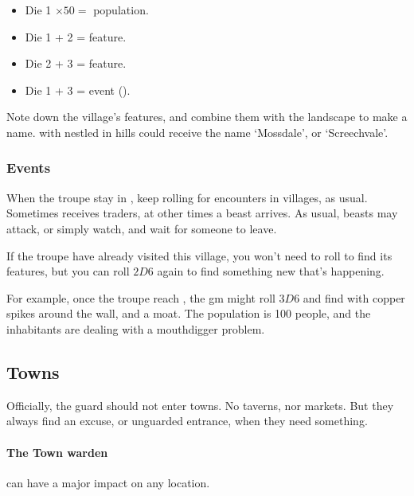 \begin{multicols}{2}
\begin{itemize}
  \item
  Die 1 $\times 50 =$ population.
  \item
  Die 1 + 2 = feature.
  \item
  Die 2 + 3 = feature.
  \item
  Die 1 + 3 = event ().
\end{itemize}

Note down the \gls{village}'s features, and combine them with the landscape to make a name.
 with  nestled in hills could receive the name `Mossdale', or `Screechvale'.

\encVillageFeatures

\subsubsection{ Events}
\label{villageEvents}

When the troupe stay in , keep rolling for encounters in \glspl{village}, as usual.
Sometimes  receives traders, at other times a beast arrives.
As usual, beasts may attack, or simply watch, and wait for someone to leave.

If the troupe have already visited this \gls{village}, you won't need to roll to find its features, but you can roll $2D6$ again to find something new that's happening.

\encVillageEvent


For example, once the troupe reach , the \gls{gm} might roll $3D6$ and find  with copper spikes around the wall, and a moat.
The population is 100 people, and the inhabitants are dealing with a mouthdigger problem.

\subsection{Towns}

Officially, the \gls{guard} should not enter towns.
No taverns, nor markets.
But they always find an excuse, or unguarded entrance, when they need something.

\paragraph{The Town \gls{warden}}
\label{encTownWarden}
can have a major impact on any location.


\end{multicols}
